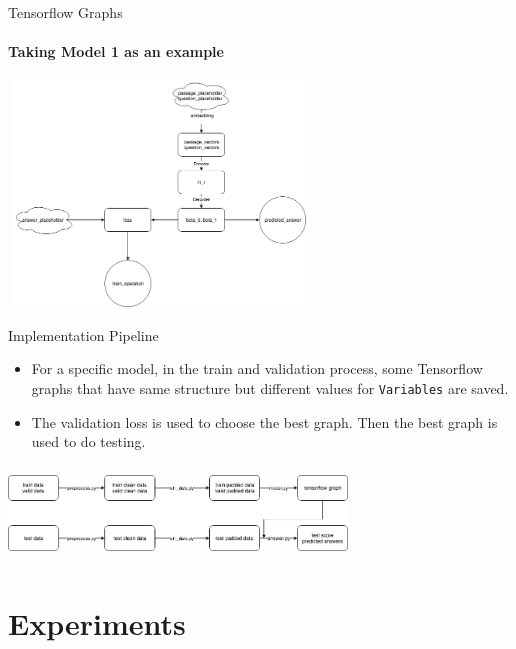 \documentclass{beamer}
\begin{document}
\begin{frame}{Tensorflow Graphs}\framesubtitle{Taking Model 1 as an example}
    \begin{center}
        \includegraphics[width=8cm, height=6cm]{figures/tf_graph.png}
    \end{center}
\end{frame}

\begin{frame}{Implementation Pipeline}
    \begin{itemize}
        \item For a specific model, in the train and validation process, some Tensorflow graphs that have same structure but different values for {\tt Variables} are saved.
        \item The validation loss is used to choose the best graph. Then the best graph is used to do testing.
    \end{itemize}
    \begin{center}
      \includegraphics[width=9cm, height=2.5cm]{figures/pipeline.png}
    \end{center}
\end{frame}

\section{Experiments}
\end{document}
